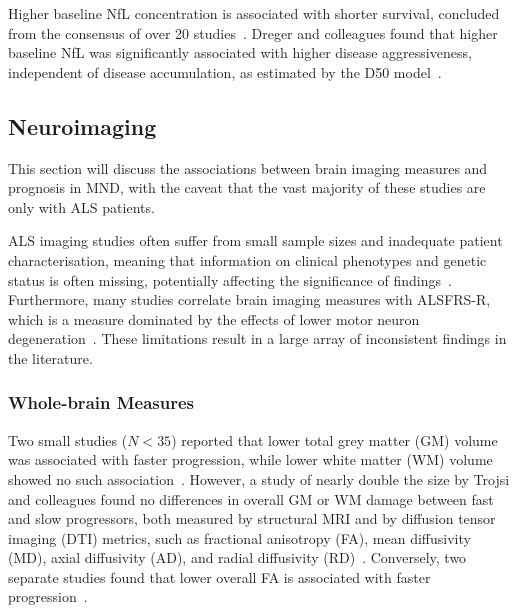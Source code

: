 Higher baseline NfL concentration is associated with shorter survival, concluded from the consensus of over 20 studies~\cite{irwinFluidBiomarkersAmyotrophic2024}.
Dreger and colleagues found that higher baseline NfL was significantly associated with higher disease aggressiveness, independent of disease accumulation, as estimated by the D50 model~\cite{dregerCerebrospinalFluidNeurofilament2021}.

\subsection{Neuroimaging}
This section will discuss the associations between brain imaging measures and prognosis in MND, with the caveat that the vast majority of these studies are only with ALS patients.

ALS imaging studies often suffer from small sample sizes and inadequate patient characterisation, meaning that information on clinical phenotypes and genetic status is often missing, potentially affecting the significance of findings~\cite{bedeLessonsALSImaging2014}.
Furthermore, many studies correlate brain imaging measures with ALSFRS-R, which is a measure dominated by the effects of lower motor neuron degeneration~\cite{bedeLessonsALSImaging2014}.
These limitations result in a large array of inconsistent findings in the literature.

\subsubsection*{Whole-brain Measures}
Two small studies ($N<35$) reported that lower total grey matter (GM) volume was associated with faster progression, while lower white matter (WM) volume showed no such association~\cite{elmendiliAssociationBrainUpper2023, bedeLongitudinalStructuralChanges2018}.
However, a study of nearly double the size by Trojsi and colleagues found no differences in overall GM or WM damage between fast and slow progressors, both measured by structural MRI and by diffusion tensor imaging (DTI) metrics, such as fractional anisotropy (FA), mean diffusivity (MD), axial diffusivity (AD), and radial diffusivity (RD)~\cite{trojsiRestingStateFunctional2021}.
Conversely, two separate studies found that lower overall FA is associated with faster progression~\cite{sendaStructuralMRICorrelates2017, baldaranovLongitudinalDiffusionTensor2017}.

